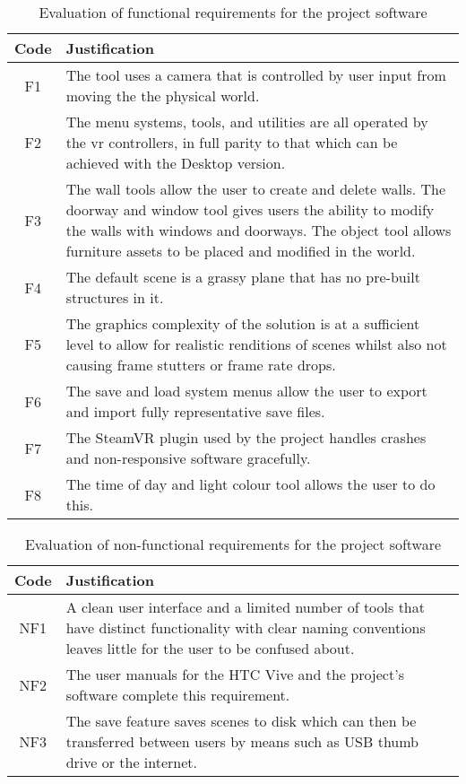     \begin{center}
        \begin{longtable}{ | c | p{} |  }
            \caption{Evaluation of functional requirements for the project software}\label{tab:fun_requirements_eval}\\%
            \hline Code & Justification\\ \hline
                F1 & The tool uses a camera that is controlled by user input from moving the the physical world. \\  \hline
                F2 & The menu systems, tools, and utilities are all operated by the \acrshort{vr} controllers, in full parity to that which can be achieved with the Desktop version. \\\hline
                F3 & The wall tools allow the user to create and delete walls. The doorway and window tool gives users the ability to modify the walls with windows and doorways. The object tool allows furniture assets to be placed and modified in the world. \\\hline
                F4 & The default scene is a grassy plane that has no pre-built structures in it. \\\hline
                F5 & The graphics complexity of the solution is at a sufficient level to allow for realistic renditions of scenes whilst also not causing frame stutters or frame rate drops. \\\hline
                F6 & The save and load system menus allow the user to export and import fully representative save files. \\\hline
                F7 & The SteamVR plugin used by the project handles crashes and non-responsive software gracefully. \\\hline
                F8 & The time of day and light colour tool allows the user to do this. \\\hline
        \end{longtable}
    \end{center}
    
    \begin{center}
        \begin{longtable}{ | c | p{} | }
            \caption{Evaluation of non-functional requirements for the project software}\label{tab:nonfun_requirements_eval}\\%
            \hline Code & Justification\\ \hline
            NF1 & A clean user interface and a limited number of tools that have distinct functionality with clear naming conventions leaves little for the user to be confused about. \\  \hline
            NF2 & The user manuals for the HTC Vive and the project's software complete this requirement. \\\hline
            NF3 & The save feature saves scenes to disk which can then be transferred between users by means such as USB thumb drive or the internet. \\\hline
        \end{longtable}
    \end{center}

